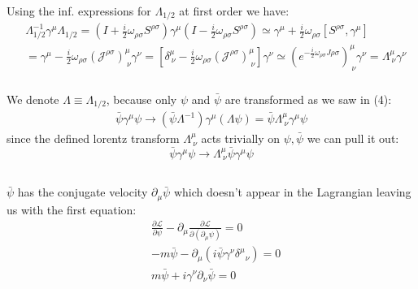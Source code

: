 \documentclass[11pt]{article}
\newcommand{\lagr}{\mathcal{L}}
\begin{document}
\subsubsection{}
Using the inf. expressions for $\Lambda_{1/2}$ at first order we have:
\begin{equation}
\begin{split}
    &\Lambda^{-1}_{1/2} \gamma^\mu  \Lambda_{1/2} = \left(I+\frac{i}{2}\omega_{\rho\sigma}S^{\rho\sigma} \right)\gamma^\mu \left(I-\frac{i}{2}\omega_{\rho\sigma}S^{\rho\sigma} \right) \simeq \gamma^\mu + \frac{i}{2}\omega_{\rho\sigma}[S^{\rho\sigma},\gamma^\mu] \\ &= \gamma^\mu - \frac{i}{2}\omega_{\rho\sigma} (\mathcal J ^{\rho\sigma})^\mu_{\ \nu} \gamma^\nu = \left[\delta^\mu_{\ \nu} - \frac{i}{2}\omega_{\rho\sigma} (\mathcal J ^{\rho\sigma})^\mu_{\ \nu} \right]\gamma^\nu \simeq (e^{-\frac{i}{2}\omega_{\rho\sigma}J{\rho\sigma}})^\mu_{\ \nu}\gamma^\nu = \Lambda^\mu_{\ \nu}\gamma^\nu
\end{split}
\end{equation}


\subsubsection{}
We denote $\Lambda \equiv \Lambda_{1/2}$, because only $\psi$ and $\bar\psi$ are transformed as we saw in (4):
\begin{equation}
    \begin{split}
        \bar \psi \gamma^\mu \psi \to (\bar\psi\Lambda^{-1}) \gamma^\mu (\Lambda\psi)=\bar\psi\Lambda^\mu_{\ \nu}\gamma^\mu \psi
    \end{split}
\end{equation}
since the defined lorentz transform $\Lambda^\mu_{\ \nu}$ acts trivially on $\psi,\bar\psi$ we can pull it out: $$\bar \psi \gamma^\mu \psi \to \Lambda^\mu_{\ \nu}\bar\psi \gamma^\mu \psi$$

\subsection{}
$\bar\psi$ has the conjugate velocity $\partial_\mu \bar\psi$ which doesn't appear in the Lagrangian leaving us with the first equation:
\begin{equation}
\begin{split}
    &\frac{\partial\lagr}{\partial\psi} - \partial_\mu\frac{\partial\lagr}{\partial(\partial_\mu\psi)} = 0\\
    &-m\bar\psi - \partial_\mu\left(i\bar\psi\gamma^\nu\delta^\mu{}_{\nu} \right) = 0\\
    &m\bar\psi + i\gamma^\nu\partial_\nu\bar\psi = 0
\end{split}
\end{equation}
\end{document}
